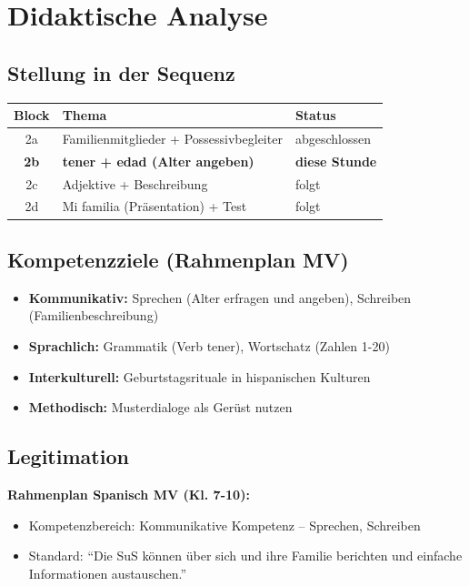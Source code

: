 \documentclass[11pt,a4paper]{article}
\begin{document}
\section{Didaktische Analyse}

\subsection{Stellung in der Sequenz}
\begin{tabular}{|c|l|l|}
\hline
\textbf{Block} & \textbf{Thema} & \textbf{Status} \\
\hline
2a & Familienmitglieder + Possessivbegleiter & abgeschlossen \\
\textbf{2b} & \textbf{tener + edad (Alter angeben)} & \textbf{diese Stunde} \\
2c & Adjektive + Beschreibung & folgt \\
2d & Mi familia (Präsentation) + Test & folgt \\
\hline
\end{tabular}

\subsection{Kompetenzziele (Rahmenplan MV)}
\begin{itemize}
    \item \textbf{Kommunikativ:} Sprechen (Alter erfragen und angeben), Schreiben (Familienbeschreibung)
    \item \textbf{Sprachlich:} Grammatik (Verb tener), Wortschatz (Zahlen 1-20)
    \item \textbf{Interkulturell:} Geburtstagsrituale in hispanischen Kulturen
    \item \textbf{Methodisch:} Musterdialoge als Gerüst nutzen
\end{itemize}

\subsection{Legitimation}
\textbf{Rahmenplan Spanisch MV (Kl. 7-10):}
\begin{itemize}
    \item Kompetenzbereich: Kommunikative Kompetenz -- Sprechen, Schreiben
    \item Standard: ``Die SuS können über sich und ihre Familie berichten und einfache Informationen austauschen.''
\end{itemize}
\end{document}

